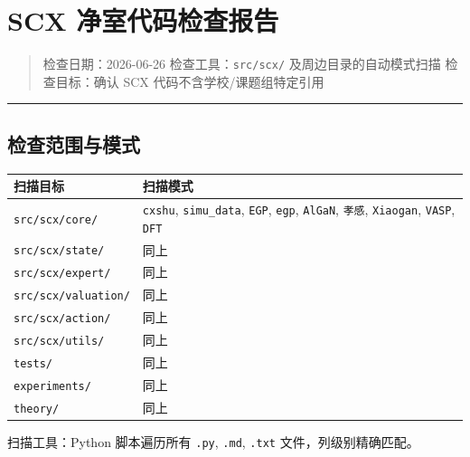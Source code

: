\documentclass[
  12pt,
]{ctexart}
\author{SCX}
\date{2026}
\begin{document}
\section{SCX
净室代码检查报告}\label{scx-ux51c0ux5ba4ux4ee3ux7801ux68c0ux67e5ux62a5ux544a}

\begin{quote}
检查日期：2026-06-26 检查工具：\texttt{src/scx/}
及周边目录的自动模式扫描 检查目标：确认 SCX 代码不含学校/课题组特定引用
\end{quote}

\begin{center}\rule{0.5\linewidth}{0.5pt}\end{center}

\subsection{检查范围与模式}\label{ux68c0ux67e5ux8303ux56f4ux4e0eux6a21ux5f0f}

\begin{longtable}[]{@{}
  >{\raggedright\arraybackslash}p{}
  >{\raggedright\arraybackslash}p{}@{}}
\toprule\noalign{}
\begin{minipage}[b]{\linewidth}\raggedright
扫描目标
\end{minipage} & \begin{minipage}[b]{\linewidth}\raggedright
扫描模式
\end{minipage} \\
\midrule\noalign{}
\endhead
\bottomrule\noalign{}
\endlastfoot
\texttt{src/scx/core/} & \texttt{cxshu}, \texttt{simu\_data},
\texttt{EGP}, \texttt{egp}, \texttt{AlGaN}, \texttt{孝感},
\texttt{Xiaogan}, \texttt{VASP}, \texttt{DFT} \\
\texttt{src/scx/state/} & 同上 \\
\texttt{src/scx/expert/} & 同上 \\
\texttt{src/scx/valuation/} & 同上 \\
\texttt{src/scx/action/} & 同上 \\
\texttt{src/scx/utils/} & 同上 \\
\texttt{tests/} & 同上 \\
\texttt{experiments/} & 同上 \\
\texttt{theory/} & 同上 \\
\end{longtable}

扫描工具：Python 脚本遍历所有 \texttt{.py}, \texttt{.md}, \texttt{.txt}
文件，列级别精确匹配。
\end{document}

